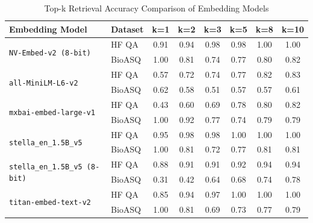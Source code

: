 \documentclass{scrartcl}
\begin{document}
\begin{table}[H]
\centering
\small
\begin{tabular}{l l c c c c c c}
\hline
\textbf{Embedding Model} & \textbf{Dataset} & \textbf{k=1} & \textbf{k=2} & \textbf{k=3} & \textbf{k=5} & \textbf{k=8} & \textbf{k=10} \\
\hline


\multirow{2}{*}{\texttt{NV-Embed-v2 (8-bit)}} 
 & HF QA  & 0.91 & 0.94 & 0.98 & 0.98 & 1.00 & 1.00 \\
 & BioASQ & 1.00 & 0.81 & 0.74 & 0.77 & 0.80 & 0.82 \\
\hline

\multirow{2}{*}{\texttt{all-MiniLM-L6-v2}} 
 & HF QA  & 0.57 & 0.72 & 0.74 & 0.77 & 0.82 & 0.83 \\
 & BioASQ & 0.62 & 0.58 & 0.51 & 0.57 & 0.57 & 0.61 \\
\hline

\multirow{2}{*}{\texttt{mxbai-embed-large-v1}} 
 & HF QA  & 0.43 & 0.60 & 0.69 & 0.78 & 0.80 & 0.82 \\
 & BioASQ & 1.00 & 0.92 & 0.77 & 0.74 & 0.79 & 0.79 \\
\hline

\multirow{2}{*}{\texttt{stella\_en\_1.5B\_v5}} 
 & HF QA  & 0.95 & 0.98 & 0.98 & 1.00 & 1.00 & 1.00 \\
 & BioASQ & 1.00 & 0.81 & 0.72 & 0.77 & 0.81 & 0.81 \\
\hline
\multirow{2}{*}{\texttt{stella\_en\_1.5B\_v5 (8-bit)}} 
 & HF QA  & 0.88 & 0.91 & 0.91 & 0.92 & 0.94 & 0.94 \\
 & BioASQ & 0.31 & 0.42 & 0.64 & 0.68 & 0.74 & 0.78 \\
\hline
\multirow{2}{*}{\texttt{titan-embed-text-v2}} 
 & HF QA  & 0.85 & 0.94 & 0.97 & 1.00 & 1.00 & 1.00 \\
 & BioASQ & 1.00 & 0.81 & 0.69 & 0.73 & 0.77 & 0.79 \\
\hline
\end{tabular}
\caption{Top-k Retrieval Accuracy Comparison of Embedding Models}
\end{table}
\end{document}
